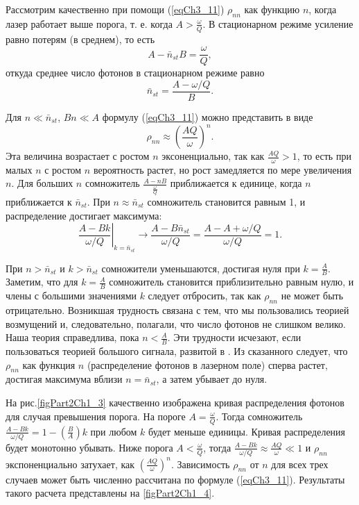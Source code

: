 Рассмотрим качественно при помощи (\ref{eqCh3_11}) $\rho_{nn}$ как
функцию $n$, когда лазер работает выше порога, т. е. когда $A >
\frac{\omega}{Q}$. В стационарном режиме усиление равно потерям (в среднем), то есть 
\[
A - \bar{n}_{st}B = \frac{\omega}{Q},
\]
откуда среднее число фотонов в стационарном режиме равно
\[
\bar{n}_{st} = \frac{A - \omega/Q}{B}.
\] 

Для $n \ll \bar{n}_{st}$, $B n \ll A$ формулу (\ref{eqCh3_11}) можно
представить в виде 
\[
\rho_{nn} \approx \left(\frac{A Q}{\omega}\right)^n.
\]
Эта величина возрастает с ростом $n$ эксоненциально, так как $\frac{A Q}{\omega} >
1$, то есть при малых $n$ с ростом $n$ вероятность растет, но рост 
замедляется по мере увеличения $n$.  Для больших $n$ сомножитель
$\frac{A - nB}{\frac{\omega}{Q}}$
приближается к единице, когда $n$ приближается к $\bar{n}_{st}$. 
При $n \approx \bar{n}_{st}$ сомножитель становится равным  1,  и
распределение достигает максимума: 
\[
\left.\frac{A - B k}{\omega/Q}\right|_{k = \bar{n}_{st}}
\rightarrow \frac{A - B \bar{n}_{st}}{\omega/Q} = 
\frac{A - A + \omega/Q}{\omega/Q} = 1.
\] 

При $n > \bar{n}_{st}$ и $k > \bar{n}_{st}$ сомножители уменьшаются,
достигая нуля при $k = \frac{A}{B}$. Заметим, 
что для $k = \frac{A}{B}$ сомножитель становится приблизительно равным
нулю, и члены с большими значениями $k$ следует отбросить, так как
$\rho_{nn}$ не может быть отрицательно. Возникшая трудность связана с
тем, что мы пользовались теорией возмущений и, следовательно,
полагали, что число фотонов не слишком велико. Наша теория
справедлива, пока $n < \frac{A}{B}$.  Эти трудности 
исчезают, если пользоваться теорией большого сигнала, развитой в
\cite{bScally1974}. Из сказанного следует, что $\rho_{nn}$ как
функция  $n$ (распределение фотонов в лазерном поле) сперва растет,
достигая максимума вблизи $n = \bar{n}_{st}$, а затем убывает до нуля.   



На рис.\ref{figPart2Ch1_3} качественно изображена кривая распределения
фотонов для 
случая превышения порога. На пороге $A = \frac{\omega}{Q}$.  Тогда
сомножитель $\frac{A - B k}{\omega/Q} = 1 - \left(\frac{B}{A}\right)k$
при любом $k$ будет меньше единицы. Кривая распределения будет монотонно
убывать. Ниже порога $A < \frac{\omega}{Q}$, тогда $\frac{A - B
  k}{\omega/Q} \approx \frac{A Q}{\omega} \ll 1$ и $\rho_{nn}$
экспоненциально затухает, как $\left(\frac{A
  Q}{\omega}\right)^n$. Зависимость $\rho_{nn}$ от $n$ для всех трех
случаев может быть численно рассчитана по формуле
(\ref{eqCh3_11}). Результаты такого расчета представлены на
\autoref{figPart2Ch1_4}. 

